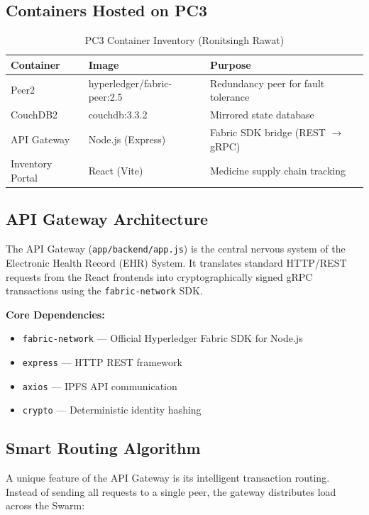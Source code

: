 \subsection{Containers Hosted on PC3}

\begin{table}[h]
\centering
\caption{PC3 Container Inventory (Ronitsingh Rawat)}
\label{tab:ronit_containers}
\begin{tabular}{|l|l|p{6cm}|}
\hline
\textbf{Container} & \textbf{Image} & \textbf{Purpose} \\
\hline
Peer2 & hyperledger/fabric-peer:2.5 & Redundancy peer for fault tolerance \\
\hline
CouchDB2 & couchdb:3.3.2 & Mirrored state database \\
\hline
API Gateway & Node.js (Express) & Fabric SDK bridge (REST $\to$ gRPC) \\
\hline
Inventory Portal & React (Vite) & Medicine supply chain tracking \\
\hline
\end{tabular}
\end{table}

\subsection{API Gateway Architecture}

The API Gateway (\texttt{app/backend/app.js}) is the central nervous system of the Electronic Health Record (EHR) System. It translates standard HTTP/REST requests from the React frontends into cryptographically signed gRPC transactions using the \texttt{fabric-network} SDK.

\textbf{Core Dependencies:}
\begin{itemize}
    \item \texttt{fabric-network} — Official Hyperledger Fabric SDK for Node.js
    \item \texttt{express} — HTTP REST framework
    \item \texttt{axios} — IPFS API communication
    \item \texttt{crypto} — Deterministic identity hashing
\end{itemize}

\subsection{Smart Routing Algorithm}

A unique feature of the API Gateway is its intelligent transaction routing. Instead of sending all requests to a single peer, the gateway distributes load across the Swarm:

